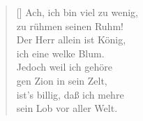 \begin{multicols}{2}
\begin{verse}[\versewidth]
 Ach, ich bin viel zu wenig,\\
zu rühmen seinen Ruhm!\\
Der Herr allein ist König,\\
ich eine welke Blum.\\
Jedoch weil ich gehöre\\
gen Zion in sein Zelt,\\
ist's billig, daß ich mehre\\
sein Lob vor aller Welt.

\end{verse}
\end{multicols}
